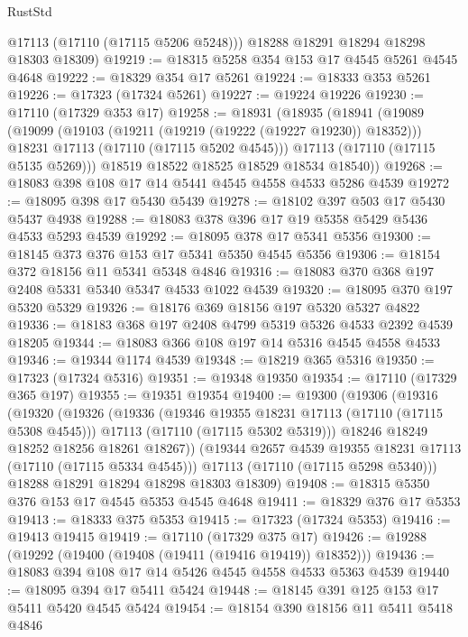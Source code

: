 \begin{lexlean}{RustStd}
\begin{coremodule}
        @17113
        (@17110 (@17115 @5206 @5248)))
      @18288
      @18291
      @18294
      @18298
      @18303
      @18309)
@19219 := @18315 @5258 @354 @153 @17 @4545 @5261 @4545 @4648
@19222 := @18329 @354 @17 @5261
@19224 := @18333 @353 @5261
@19226 := @17323 (@17324 @5261)
@19227 := @19224 @19226
@19230 := @17110 (@17329 @353 @17)
@19258 := @18931
    (@18935
      (@18941
        (@19089
          (@19099
            (@19103 (@19211 (@19219 (@19222 (@19227 @19230)) @18352)))
            @18231
            @17113
            (@17110 (@17115 @5202 @4545)))
          @17113
          (@17110 (@17115 @5135 @5269)))
        @18519
        @18522
        @18525
        @18529
        @18534
        @18540))
@19268 := @18083 @398 @108 @17 @14 @5441 @4545 @4558 @4533 @5286 @4539
@19272 := @18095 @398 @17 @5430 @5439
@19278 := @18102 @397 @503 @17 @5430 @5437 @4938
@19288 := @18083 @378 @396 @17 @19 @5358 @5429 @5436 @4533 @5293 @4539
@19292 := @18095 @378 @17 @5341 @5356
@19300 := @18145 @373 @376 @153 @17 @5341 @5350 @4545 @5356
@19306 := @18154 @372 @18156 @11 @5341 @5348 @4846
@19316 := @18083 @370 @368 @197 @2408 @5331 @5340 @5347 @4533 @1022 @4539
@19320 := @18095 @370 @197 @5320 @5329
@19326 := @18176 @369 @18156 @197 @5320 @5327 @4822
@19336 := @18183 @368 @197 @2408 @4799 @5319 @5326 @4533 @2392 @4539 @18205
@19344 := @18083 @366 @108 @197 @14 @5316 @4545 @4558 @4533
@19346 := @19344 @1174 @4539
@19348 := @18219 @365 @5316
@19350 := @17323 (@17324 @5316)
@19351 := @19348 @19350
@19354 := @17110 (@17329 @365 @197)
@19355 := @19351 @19354
@19400 := @19300
    (@19306
      (@19316
        (@19320
          (@19326
            (@19336
              (@19346 @19355 @18231 @17113 (@17110 (@17115 @5308 @4545)))
              @17113
              (@17110 (@17115 @5302 @5319)))
            @18246
            @18249
            @18252
            @18256
            @18261
            @18267))
        (@19344 @2657 @4539 @19355 @18231 @17113 (@17110 (@17115 @5334 @4545)))
        @17113
        (@17110 (@17115 @5298 @5340)))
      @18288
      @18291
      @18294
      @18298
      @18303
      @18309)
@19408 := @18315 @5350 @376 @153 @17 @4545 @5353 @4545 @4648
@19411 := @18329 @376 @17 @5353
@19413 := @18333 @375 @5353
@19415 := @17323 (@17324 @5353)
@19416 := @19413 @19415
@19419 := @17110 (@17329 @375 @17)
@19426 := @19288 (@19292 (@19400 (@19408 (@19411 (@19416 @19419)) @18352)))
@19436 := @18083 @394 @108 @17 @14 @5426 @4545 @4558 @4533 @5363 @4539
@19440 := @18095 @394 @17 @5411 @5424
@19448 := @18145 @391 @125 @153 @17 @5411 @5420 @4545 @5424
@19454 := @18154 @390 @18156 @11 @5411 @5418 @4846

\end{coremodule}
\end{lexlean}

